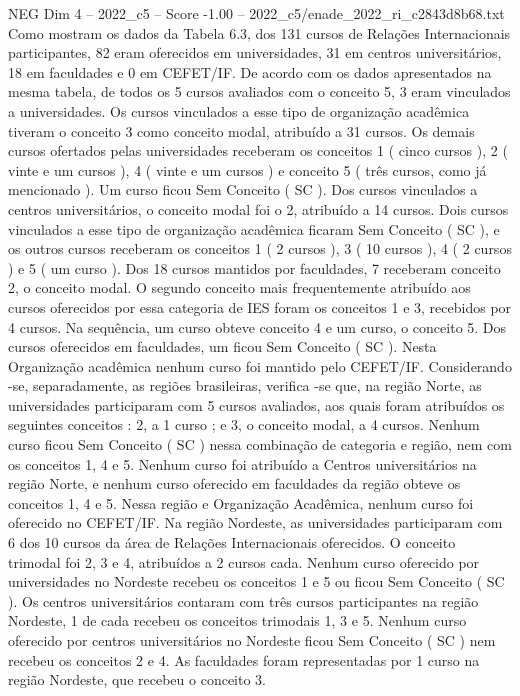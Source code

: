 \begin{textsample}{NEG Dim 4 – 2022\_c5 – Score -1.00 – 2022\_c5/enade\_2022\_ri\_c2843d8b68.txt}
Como mostram os dados da Tabela 6.3, dos 131 cursos de Relações Internacionais participantes, 82 eram oferecidos em universidades, 31 em centros universitários, 18 em faculdades e 0 em CEFET/IF.
De acordo com os dados apresentados na mesma tabela, de todos os 5 cursos avaliados com o conceito 5, 3 eram vinculados a universidades.
Os cursos vinculados a esse tipo de organização acadêmica tiveram o conceito 3 como conceito modal, atribuído a 31 cursos.
Os demais cursos ofertados pelas universidades receberam os conceitos 1 ( cinco cursos ), 2 ( vinte e um cursos ), 4 ( vinte e um cursos ) e conceito 5 ( três cursos, como já mencionado ).
Um curso ficou Sem Conceito ( SC ).
Dos cursos vinculados a centros universitários, o conceito modal foi o 2, atribuído a 14 cursos.
Dois cursos vinculados a esse tipo de organização acadêmica ficaram Sem Conceito ( SC ), e os outros cursos receberam os conceitos 1 ( 2 cursos ), 3 ( 10 cursos ), 4 ( 2 cursos ) e 5 ( um curso ).
Dos 18 cursos mantidos por faculdades, 7 receberam conceito 2, o conceito modal.
O segundo conceito mais frequentemente atribuído aos cursos oferecidos por essa categoria de IES foram os conceitos 1 e 3, recebidos por 4 cursos.
Na sequência, um curso obteve conceito 4 e um curso, o conceito 5.
Dos cursos oferecidos em faculdades, um ficou Sem Conceito ( SC ).
Nesta Organização acadêmica nenhum curso foi mantido pelo CEFET/IF.
Considerando -se, separadamente, as regiões brasileiras, verifica -se que, na região Norte, as universidades participaram com 5 cursos avaliados, aos quais foram atribuídos os seguintes conceitos : 2, a 1 curso ; e 3, o conceito modal, a 4 cursos.
Nenhum curso ficou Sem Conceito ( SC ) nessa combinação de categoria e região, nem com os conceitos 1, 4 e 5.
Nenhum curso foi atribuído a Centros universitários na região Norte, e nenhum curso oferecido em faculdades da região obteve os conceitos 1, 4 e 5.
Nessa região e Organização Acadêmica, nenhum curso foi oferecido no CEFET/IF.
Na região Nordeste, as universidades participaram com 6 dos 10 cursos da área de Relações Internacionais oferecidos.
O conceito trimodal foi 2, 3 e 4, atribuídos a 2 cursos cada.
Nenhum curso oferecido por universidades no Nordeste recebeu os conceitos 1 e 5 ou ficou Sem Conceito ( SC ).
Os centros universitários contaram com três cursos participantes na região Nordeste, 1 de cada recebeu os conceitos trimodais 1, 3 e 5.
Nenhum curso oferecido por centros universitários no Nordeste ficou Sem Conceito ( SC ) nem recebeu os conceitos 2 e 4.
As faculdades foram representadas por 1 curso na região Nordeste, que recebeu o conceito 3.

\end{textsample}
